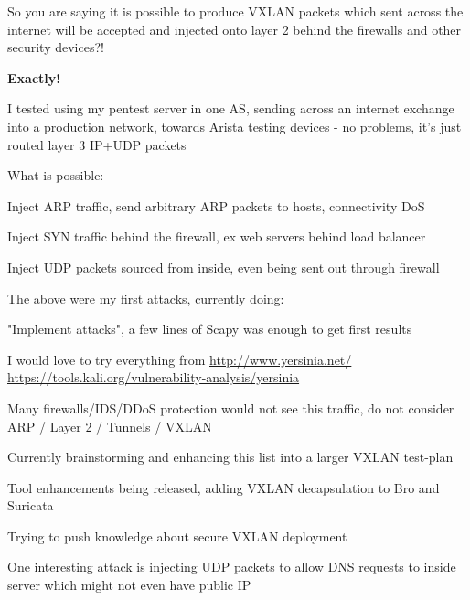 \documentclass[16pt,landscape,a4paper,footrule]{foils}
\begin{document}
So you are saying it is possible to produce VXLAN packets which sent across the internet will be accepted and injected onto layer 2 behind the firewalls and other security devices?!

\vskip 1cm
{\bf\LARGE Exactly!}



I tested using my pentest server in one AS, sending across an internet exchange into a production network, towards Arista testing devices - no problems, it's just routed layer 3 IP+UDP packets


What is possible:
\begin{list2}
\item Inject ARP traffic, send arbitrary ARP packets to hosts, connectivity DoS
\item Inject SYN traffic behind the firewall, ex web servers behind load balancer
\item Inject UDP packets sourced from inside, even being sent out through firewall
\end{list2}
The above were my first attacks, currently doing:
\begin{list2}
\item "Implement attacks", a few lines of Scapy was enough to get first results \smiley
\item I would love to try everything from  \url{http://www.yersinia.net/}\\ \url{https://tools.kali.org/vulnerability-analysis/yersinia}
\item Many firewalls/IDS/DDoS protection would not see this traffic, do not consider ARP / Layer 2 / Tunnels / VXLAN
\item Currently brainstorming and enhancing this list into a larger VXLAN test-plan
\item Tool enhancements being released, adding VXLAN decapsulation to Bro and Suricata
\item Trying to push knowledge about secure VXLAN deployment
\end{list2}



One interesting attack is injecting UDP packets to allow DNS requests to inside server which might not even have public IP
\end{document}
